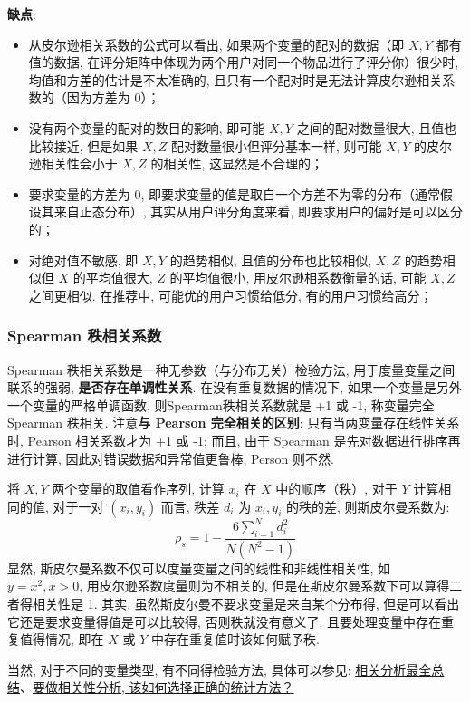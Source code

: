 \textbf{缺点}: 
\begin{itemize}
	\item 从皮尔逊相关系数的公式可以看出, 如果两个变量的配对的数据（即 $X, Y$ 都有值的数据, 在评分矩阵中体现为两个用户对同一个物品进行了评分你）很少时, 均值和方差的估计是不太准确的, 且只有一个配对时是无法计算皮尔逊相关系数的（因为方差为 0）；
	\item 没有两个变量的配对的数目的影响, 即可能 $X, Y$ 之间的配对数量很大, 且值也比较接近, 但是如果 $X, Z$ 配对数量很小但评分基本一样, 则可能 $X, Y$ 的皮尔逊相关性会小于 $X, Z$ 的相关性, 这显然是不合理的；
	\item 要求变量的方差为 0, 即要求变量的值是取自一个方差不为零的分布（通常假设其来自正态分布）, 其实从用户评分角度来看, 即要求用户的偏好是可以区分的；
	\item 对绝对值不敏感, 即 $X, Y$ 的趋势相似, 且值的分布也比较相似, $X, Z$ 的趋势相似但 $X$ 的平均值很大, $Z$ 的平均值很小, 用皮尔逊相系数衡量的话, 可能 $X, Z$ 之间更相似. 在推荐中, 可能优的用户习惯给低分, 有的用户习惯给高分； 
\end{itemize}

\subsubsection{Spearman 秩相关系数}
Spearman 秩相关系数是一种无参数（与分布无关）检验方法, 用于度量变量之间联系的强弱, \textbf{是否存在单调性关系}. 在没有重复数据的情况下, 如果一个变量是另外一个变量的严格单调函数, 则Spearman秩相关系数就是 +1 或 -1, 称变量完全 Spearman 秩相关. 注意\textbf{与 Pearson 完全相关的区别}: 只有当两变量存在线性关系时, Pearson 相关系数才为 +1 或 -1; 而且, 由于 Spearman 是先对数据进行排序再进行计算, 因此对错误数据和异常值更鲁棒, Person 则不然.

将 $X, Y$ 两个变量的取值看作序列, 计算 $x_i$ 在 $X$ 中的顺序（秩）, 对于 $Y$ 计算相同的值, 对于一对 $(x_i, y_i)$ 而言, 秩差 $d_i$ 为 $x_i, y_i$ 的秩的差, 则斯皮尔曼系数为: 
$$
\rho_{s} = 1 - \frac{6 \sum_{i=1}^N d_i^2}{N(N^2 - 1)}
$$
显然, 斯皮尔曼系数不仅可以度量变量之间的线性和非线性相关性, 如 $y = x^2, x > 0$, 用皮尔逊系数度量则为不相关的, 但是在斯皮尔曼系数下可以算得二者得相关性是 1. 其实, 虽然斯皮尔曼不要求变量是来自某个分布得, 但是可以看出它还是要求变量得值是可以比较得, 否则秩就没有意义了. 且要处理变量中存在重复值得情况, 即在 $X$ 或 $Y$ 中存在重复值时该如何赋予秩. 

当然, 对于不同的变量类型, 有不同得检验方法, 具体可以参见: \href{https://zhuanlan.zhihu.com/p/396580986}{相关分析最全总结}、\href{https://zhuanlan.zhihu.com/p/94070722}{要做相关性分析, 该如何选择正确的统计方法？}

